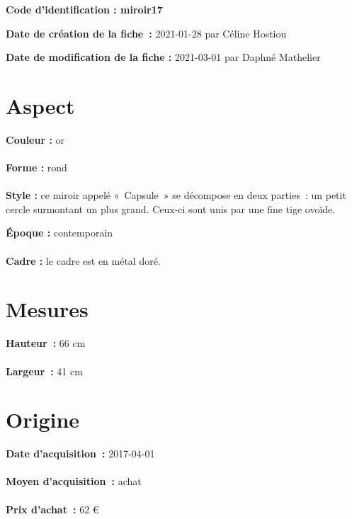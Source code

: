 
     {\bf \huge Code d’identification : miroir17} \\
    \newline \hr \begin{center} 
       
    \end{center} 
    \begin{itemize}
    
    \footnotesize {\item {\bf Date de création de la fiche :} 2021-01-28
    {par Céline Hostiou}} 
    \footnotesize {\item {\bf Date de modification de la fiche :} 2021-03-01
    {par Daphné Mathelier} \\}
    \end{itemize}
   \hr 
    \section* {Aspect} 
    {\bf \large Couleur :} or
    \\ \\ {\bf \large Forme :} rond 
    \\ \\ {\bf \large Style :}  ce miroir appelé « Capsule » se décompose en deux parties : un petit cercle
            surmontant un plus grand. Ceux-ci sont unis par une fine tige ovoïde.
         
        {\bf \large Époque :} contemporain 
    \\ \\ {\bf \large Cadre :} le cadre est en métal doré.
         
    \section* {Mesures}
     {\bf \large Hauteur :} 66 cm
   \\ \\ {\bf \large Largeur :} 41 cm 
  
    \section* {Origine}
    {\bf \large Date d’acquisition :} 2017-04-01 \\ \\
    {\bf \large Moyen d’acquisition :} achat \\ \\ {\bf \large Prix d’achat :}
        62 € 
      
